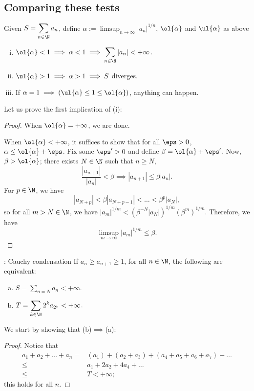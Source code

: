 \subsection{Comparing these tests}
Given \(S=\displaystyle\sum_{n\in\N}a_n\), define \(\alpha:=\displaystyle\limsup_{n\to\infty}|a_n|^{1/n}\), \(\ol{\alpha}\) and \(\ul{\alpha}\) as above
\begin{enumerate}[(i)]
	\item \(\ol{\alpha}<1\implies \alpha<1\implies \displaystyle\sum_{n\in\N}|a_n|<+\infty\).
	
	\item \(\ul{\alpha}>1\implies \alpha>1\implies S\) diverges.
	
	\item If \(\alpha=1\implies (\ul{\alpha}\leq 1\leq\ol{\alpha})\), anything can happen.
\end{enumerate}
Let us prove the first implication of (i):
\begin{proof}
	When \(\ol{\alpha}=+\infty\), we are done.
	
	\medskip
	
	When \(\ol{\alpha}<+\infty\), it suffices to show that for all \(\eps>0\), \(\alpha\leq \ol{\alpha}+\eps\). Fix some \(\eps'>0\) and define \(\beta=\ol{\alpha}+\eps'\). Now, \(\beta>\ol{\alpha}\); there exists \(N\in\N\) such that \(n\geq N\), 
	\begin{equation*}
		\frac{|a_{n+1}|}{|a_n|}<\beta\implies |a_{n+1}|\leq\beta|a_n|.
	\end{equation*}
	For \(p\in\N\), we have
	\begin{equation*}
		|a_{N+p}|<\beta|a_{N+p-1}|<\dots<\beta^p|a_N|,
	\end{equation*}
	so for all \(m>N\in\N\), we have \(|a_m|^{1/m}<(\beta^{-N}|a_N|)^{1/m}(\beta^m)^{1/m}\). Therefore, we have 
	\begin{equation*}
		\limsup_{m\to\infty}|a_m|^{1/m}\leq\beta.
	\end{equation*}
\end{proof}
\begin{ntheorem}{: Cauchy condensation}
	If \(a_n\geq a_{n+1}\geq 1\), for all \(n\in\N\), the following are equivalent:
	\begin{enumerate}[(a)]
		\item \(S=\displaystyle\sum_{n=N}a_n<+\infty\).\\
		\item  \(T=\displaystyle\sum_{k\in\N}2^ka_{2^k}<+\infty\).
	\end{enumerate}
\end{ntheorem}
We start by showing that (b)\(\implies\)(a):
\begin{proof}
	Notice that 
	\begin{align*}
		a_1+a_2+\dots+a_n=&(a_1)+(a_2+a_3)+(a_4+a_5+a_6+a_7)+\dots\\
		\leq&a_1+2a_2+4a_4+\dots\\
		\leq& T<+\infty;
	\end{align*}
	this holds for all \(n\).
\end{proof}